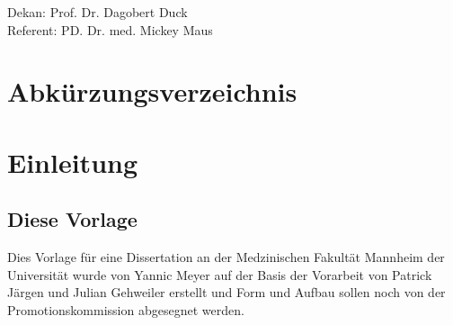 \documentclass{scrreprt}
\begin{document}
	\thispagestyle{empty}
	\vspace*{\fill}
	\begin{center}
	Dekan: Prof. Dr. Dagobert Duck\\
	Referent: PD. Dr. med. Mickey Maus
         \end{center}
\tableofcontents
\thispagestyle{empty}

\cleardoubleoddpage%
\pagestyle{scrheadings}


\chapter*{Abkürzungsverzeichnis} 
 \label{sec:abk_Verz}
\begin{acronym}[ABC] %
\end{acronym}

\chapter{Einleitung}
\section{Diese Vorlage}
Dies Vorlage für eine Dissertation an der Medzinischen Fakultät Mannheim der Universität wurde von Yannic Meyer auf der Basis der Vorarbeit von Patrick Järgen und Julian Gehweiler erstellt und Form und Aufbau sollen noch von der Promotionskommission abgesegnet werden. 
\end{document}
